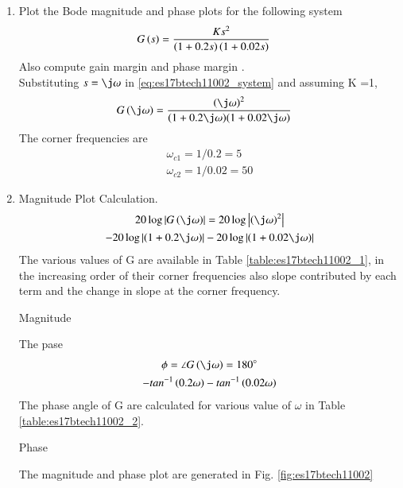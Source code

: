 \begin{enumerate}[label=\thesection.\arabic*.,ref=\thesection.\theenumi]
\item Plot the Bode magnitude and phase plots for the following system
\begin{align}
G\left(s\right) &= \frac{Ks^2}{{\left(1+0.2s\right){\left(1+0.02s\right)}}}
\label{eq:es17btech11002_system}
\end{align}
Also compute gain margin and phase margin .
\\
\solution Substituting $s=\j\omega$ in   \eqref{eq:es17btech11002_system} and 
assuming K =1,
\begin{align}
G\brak{\j\omega}&=\frac{\brak{\j\omega}^2}{{\brak{1+0.2\j\omega}}{\brak{1+0.02\j\omega}}}
\end{align}
The corner frequencies are
\begin{align}
\omega_{c1}=1/0.2 = 5
\\
\omega_{c2}=1/0.02 = 50
\end{align}
\item Magnitude Plot Calculation.
\\
\solution
\begin{multline}
20\log\abs{G\brak{\j\omega}} = 20\log\abs{\brak{\j\omega}^2}\\-20\log\abs{\brak{1+0.2\j\omega}} -20\log\abs{\brak{1+0.02\j\omega}}
\end{multline}
The various values of G\brak{\j\omega} are available in Table  \ref{table:es17btech11002_1}, in the increasing order of their corner frequencies also slope contributed by each term and the change in slope at the corner frequency.
\begin{table}[!ht]
\centering

\caption{Magnitude}
\label{table:es17btech11002_1}
\end{table}
The pase
\begin{multline}
\phi = \angle{G\brak{\j\omega}}= 180\degree
\\-tan^{-1}\brak{0.2\omega}-tan^{-1}\brak{0.02\omega}
\end{multline}
The phase angle of G\brak{\j\omega} are calculated for various value of $\omega$ in Table \ref{table:es17btech11002_2}.
\begin{table}[!ht]
\centering

\caption{Phase}
\label{table:es17btech11002_2}
\end{table}
The magnitude and phase plot are generated in Fig. \ref{fig:es17btech11002}
\begin{figure}[!h]

\end{figure}
\end{enumerate}
